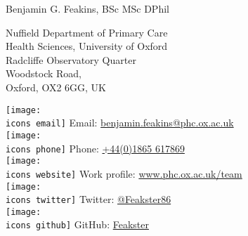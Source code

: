 \documentclass[10pt,a4paper]{article}
\def\icons{./icons/}
\def\name{Benjamin G. Feakins, BSc MSc DPhil}
\begin{document}
{\huge \name}

\vspace{0.25in}

\begin{minipage}[t]{0.5\textwidth}
	\raggedright
	Nuffield Department of Primary Care \\
	Health Sciences, University of Oxford \\
	Radcliffe Observatory Quarter \\
	Woodstock Road, \\
	Oxford, OX2 6GG, UK \\
\end{minipage}\begin{minipage}[t]{0.5\textwidth}
	\raggedright
	\texttt{[image: \\icons email]} Email: \href{mailto:benjamin.feakins@phc.ox.ac.uk}{benjamin.feakins@phc.ox.ac.uk} \\
	\texttt{[image: \\icons phone]} Phone: \href{tel:441865617869}{+44(0)1865 617869} \\
	\texttt{[image: \\icons website]} Work profile: \href{https://www.phc.ox.ac.uk/team/ben-feakins}{www.phc.ox.ac.uk/team} \\
	\texttt{[image: \\icons twitter]} Twitter:  \href{https://twitter.com/Feakster86}{@Feakster86} \\
	\texttt{[image: \\icons github]} GitHub: \href{https://github.com/Feakster}{Feakster} \\
\end{minipage}

\vspace{0.25in}

\sloppy
\end{document}
